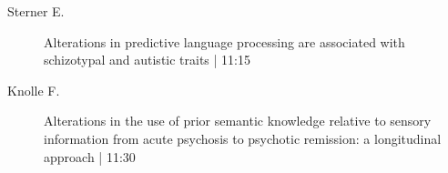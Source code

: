 \begin{symposium}
\begin{description}
                \item [ Sterner E.] Alterations in predictive language processing are associated with schizotypal and autistic traits  \textcolor{mygray}{ | 11:15}    
                
                \item [ Knolle F.] Alterations in the use of prior semantic knowledge relative to sensory information from acute psychosis to psychotic remission: a longitudinal approach  \textcolor{mygray}{ | 11:30}    
                
            \end{description} 
            \end{symposium}
            